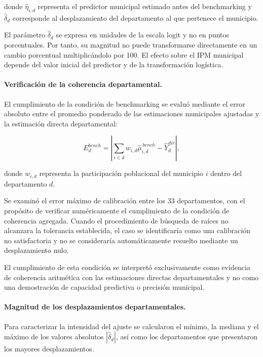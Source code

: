 donde $\widehat{\eta}_{i,d}$ representa el predictor municipal estimado antes del benchmarking y $\widehat{\delta}_d$ corresponde al desplazamiento del departamento al que pertenece el municipio.

El parámetro $\widehat{\delta}_d$ se expresa en unidades de la escala logit y no en puntos porcentuales. Por tanto, su magnitud no puede transformarse directamente en un cambio porcentual multiplicándolo por 100. El efecto sobre el IPM municipal depende del valor inicial del predictor y de la transformación logística.

\paragraph{Verificación de la coherencia departamental.}

El cumplimiento de la condición de benchmarking se evaluó mediante el error absoluto entre el promedio ponderado de las estimaciones municipales ajustadas y la estimación directa departamental:

\begin{equation}
E_d^{bench}
=
\left|
\sum_{i\in d}w_{i,d}
\widehat{\mu}_{i,d}^{\,bench}
-
\widehat{Y}_d^{dir}
\right|,
\label{eq:met-error-benchmark}
\end{equation}

donde $w_{i,d}$ representa la participación poblacional del municipio $i$ dentro del departamento $d$.

Se examinó el error máximo de calibración entre los 33 departamentos, con el propósito de verificar numéricamente el cumplimiento de la condición de coherencia agregada. Cuando el procedimiento de búsqueda de raíces no alcanzara la tolerancia establecida, el caso se identificaría como una calibración no satisfactoria y no se consideraría automáticamente resuelto mediante un desplazamiento nulo.

El cumplimiento de esta condición se interpretó exclusivamente como evidencia de coherencia aritmética con las estimaciones directas departamentales y no como una demostración de capacidad predictiva o precisión municipal.

\paragraph{Magnitud de los desplazamientos departamentales.}

Para caracterizar la intensidad del ajuste se calcularon el mínimo, la mediana y el máximo de los valores absolutos $|\widehat{\delta}_d|$, así como los departamentos que presentaron los mayores desplazamientos.

